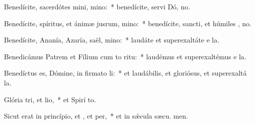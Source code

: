 \item Benedícite, sacerdótes mini, mino:~* benedícite, servi Dó, no.
\item Benedícite, spíritus, et ánimæ jusrum, mino:~* benedícite, sancti, et húmiles , no.
\item Benedícite, Ananía, Azaría, saël, mino:~* laudáte et superexaltáte e  la.
\item Benedicámus Patrem et Fílium cum to ritu:~* laudémus et superexaltémus e  la.
\item Benedíctus es, Dómine, in firmato li:~* et laudábilis, et gloriósus, et superexaltá  la.
\item Glória tri, et lio,~* et Spirí to.
\item Sicut erat in princípio, et , et per,~* et in sǽcula sæcu. men.
